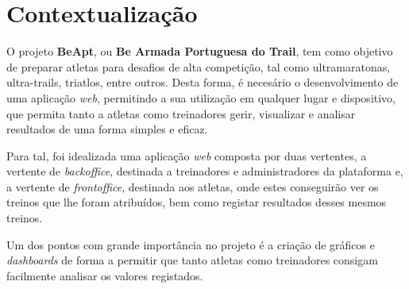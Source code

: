 \section{Contextualização}

O projeto \textbf{BeApt}, ou \textbf{Be Armada Portuguesa do Trail}, tem como objetivo de preparar atletas para desafios de alta competição, tal como ultramaratonas, ultra-trails, triatlos, entre outros. Desta forma, é necesário o desenvolvimento de uma aplicação \textit{web}, permitindo a sua utilização em qualquer lugar e dispositivo, que permita tanto a atletas como treinadores gerir, visualizar e analisar resultados de uma forma simples e eficaz.

Para tal, foi idealizada uma aplicação \textit{web} composta por duas vertentes, a vertente de \textit{backoffice}, destinada a treinadores e administradores da plataforma e, a vertente de \textit{frontoffice}, destinada aos atletas, onde estes conseguirão ver os treinos que lhe foram atribuídos, bem como registar resultados desses mesmos treinos.

Um dos pontos com grande importância no projeto é a criação de gráficos e \textit{dashboards} de forma a permitir que tanto atletas como treinadores consigam facilmente analisar os valores registados.